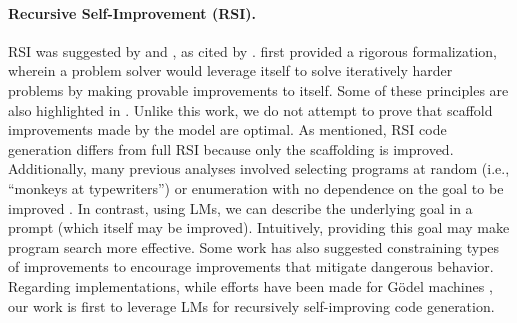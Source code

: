 \documentclass{article} %
\begin{document}
\paragraph{Recursive Self-Improvement (RSI).}
RSI was suggested by \citet{minsky_marvin_artificial_1966} and \citet{good1966speculations}, as cited by \citet{yampolskiy2015seed}. %
\citet{schmidhuber2003godel} first provided a rigorous formalization, wherein a problem solver would leverage itself to solve iteratively harder problems by making provable improvements to itself. Some of these principles are also highlighted in \citet{schmidhuber1987evolutionary}. Unlike this work, we do not attempt to prove that scaffold improvements made by the model are optimal. As mentioned, RSI code generation differs from full RSI because only the scaffolding is improved. Additionally, many previous analyses involved selecting programs at random (i.e., ``monkeys at typewriters'') or enumeration
with no dependence on the goal to be improved \citep{levin1973universal}. In contrast, using LMs, we can describe the underlying goal in a prompt (which itself may be improved). Intuitively, providing this goal may make program search more effective.  
Some work has also suggested constraining types of improvements \citep{nivel2013bounded,steunebrink2016growing} to encourage improvements that mitigate dangerous behavior. Regarding implementations, while efforts have been made for G\"odel machines \citep{hall2007self,steunebrink2012towards}, our work is first to leverage LMs for recursively self-improving code generation.
%
\end{document}
